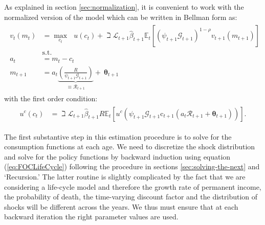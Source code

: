 \documentclass[titlepage, headings=optiontotocandhead]{Resources/texmf-local/tex/latex/econtex}
\begin{document}
As explained in section \ref{sec:normalization}, it is convenient to work with the normalized version of the model which can be written in Bellman form as:
  \begin{equation*}\begin{gathered}\begin{aligned}
        v_{t}(m_{t})  & = \max_{{c}_{t}}~~~ u(c_{t})+\beth\mathcal{L}_{t+1}\hat{\beta}_{t+1}
        {\mathbb{E}}_{t}[(\psi_{t+1}\mathcal{G}_{t+1})^{1-\rho}v_{t+1}(m_{t+1})]   \\
        & \text{s.t.}   \nonumber \\
        a_{t}    & = m_{t}-c_{t} \nonumber
        \\      m_{t+1}  & = a_{t}\underbrace{\left(\frac{R}{\psi_{t+1}\mathcal{G}_{t+1}}\right)}_{\equiv \mathcal{R}_{t+1}}+ ~\pmb{\theta}_{t+1}
      \end{aligned}\end{gathered}\end{equation*}
with the first order condition:
  \begin{equation}\begin{gathered}\begin{aligned}
        u^{c}(c_{t}) & = \beth\mathcal{L}_{t+1}\hat{\beta}_{t+1}R {\mathbb{E}}_{t}\left[u^{c}\left(\psi_{t+1}\mathcal{G}_{t+1}\mathrm{c}_{t+1}\left(a_{t}\mathcal{R}_{t+1}+\pmb{\theta}_{t+1}\right)\right)\right]\label{eq:FOCLifeCycle}
        .
      \end{aligned}\end{gathered}\end{equation}

The first substantive {step} in this estimation procedure is
to solve for the consumption functions at each age. We need to
discretize the shock distribution and solve for the policy
functions by backward induction using equation (\ref{eq:FOCLifeCycle})
following the procedure in sections \ref{sec:solving-the-next} and
`Recursion.' The latter routine
is slightly complicated by the fact that we are considering a
life-cycle model and therefore the growth rate of permanent income,
the probability of death, the time-varying discount factor and the
distribution of shocks will be different across the years. We thus
must ensure that at each backward iteration the right parameter
values are used.
\end{document}
